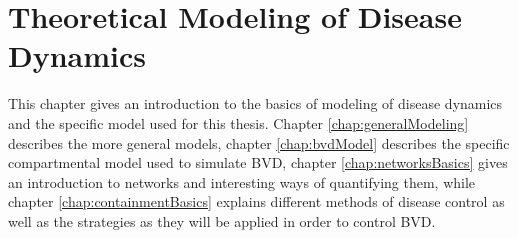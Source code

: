 \chapter{Theoretical Modeling of Disease Dynamics} 
This chapter gives an introduction to the basics of modeling of disease dynamics and the specific model used for this thesis. Chapter \ref{chap:generalModeling} describes the more general models, chapter \ref{chap:bvdModel} describes the specific compartmental model used to simulate BVD, chapter \ref{chap:networksBasics} gives an introduction to networks and interesting ways of quantifying them, while chapter \ref{chap:containmentBasics} explains different methods of disease control as well as the strategies as they will be applied in order to control BVD.




